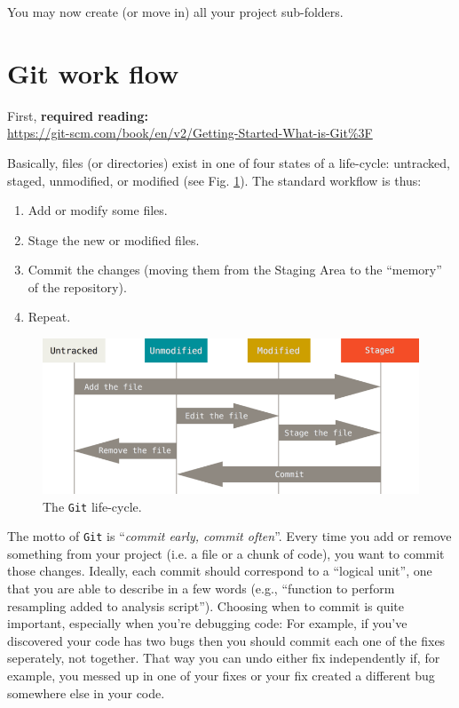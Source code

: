 \documentclass[12pt,letterpaper]{article}
\begin{document}
You may now create (or move in) all your project sub-folders.


\section{Git work flow}
First, \textbf{required reading:}\\
\url{https://git-scm.com/book/en/v2/Getting-Started-What-is-Git%3F}

Basically, files (or directories) exist in one of four states of a life-cycle: untracked, staged, unmodified, or modified (see Fig. \ref{fig:lifecycle}).  The standard workflow is thus:
\begin{enumerate}
	\item Add or modify some files.
	\item Stage the new or modified files.
	\item Commit the changes (moving them from the Staging Area to the ``memory'' of the repository).
	\item Repeat.
\end{enumerate}

\begin{figure}
	\includegraphics[width=\linewidth]{lifecycle.png}
	\caption{The \texttt{Git} life-cycle.}
	\label{fig:lifecycle}
\end{figure}

The motto of \texttt{Git} is ``\emph{commit early, commit often}''.  Every time you add or remove something from your project (i.e. a file or a chunk of code), you want to commit those changes.   Ideally, each commit should correspond to a ``logical unit'', one that you are able to describe in a few words (e.g., ``function to perform resampling added to analysis script''). Choosing when to commit is quite important, especially when you're debugging code:  For example, if you've discovered your code has two bugs then you should commit each one of the fixes seperately, not together.  That way you can undo either fix independently if, for example, you messed up in one of your fixes or your fix created a different bug somewhere else in your code.
\end{document}

